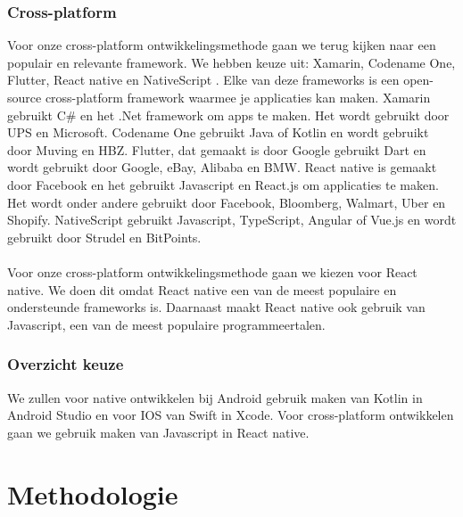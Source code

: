 \subsubsection{Cross-platform}
Voor onze cross-platform ontwikkelingsmethode gaan we terug kijken naar een populair en 
relevante framework. We hebben keuze uit: Xamarin, Codename One, Flutter, React native en 
NativeScript \autocite{Zubair2022}. Elke van deze frameworks is een open-source cross-platform 
framework waarmee je applicaties kan maken. Xamarin gebruikt C\# en het .Net framework om apps 
te maken. Het wordt gebruikt door UPS en Microsoft. Codename One gebruikt Java of Kotlin en wordt 
gebruikt door Muving en HBZ. Flutter, dat gemaakt is door Google gebruikt Dart en wordt gebruikt 
door Google, eBay, Alibaba en BMW. React native is gemaakt door Facebook en het gebruikt Javascript 
en React.js om applicaties te maken. Het wordt onder andere gebruikt door Facebook, Bloomberg, 
Walmart, Uber en Shopify. NativeScript gebruikt Javascript, TypeScript, Angular of Vue.js en wordt 
gebruikt door Strudel en BitPoints. \autocite{Thaker2022}
\\\\
Voor onze cross-platform ontwikkelingsmethode gaan we kiezen voor React native. We doen dit 
omdat React native een van de meest populaire en ondersteunde frameworks is. Daarnaast maakt 
React native ook gebruik van Javascript, een van de meest populaire programmeertalen.

\subsubsection{Overzicht keuze}
We zullen voor native ontwikkelen bij Android gebruik maken van Kotlin in Android Studio en voor 
IOS van Swift in Xcode. Voor cross-platform ontwikkelen gaan we gebruik maken van Javascript in React native.

\section{Methodologie}%
\label{sec:methodologie}

